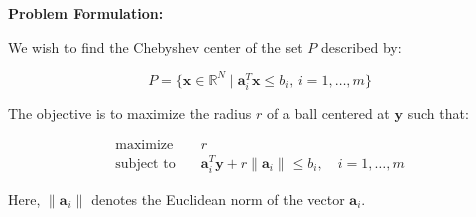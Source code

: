 \documentclass{article}
\begin{document}
\textbf{Problem Formulation:}

We wish to find the Chebyshev center of the set \( P \) described by:

\[
P = \{ \mathbf{x} \in \mathbb{R}^N \mid \mathbf{a}_i^T \mathbf{x} \leq b_i, \, i = 1, \ldots, m \}
\]

The objective is to maximize the radius \( r \) of a ball centered at \( \mathbf{y} \) such that:

\[
\begin{align*}
\text{maximize} \quad & r \\
\text{subject to} \quad & \mathbf{a}_i^T \mathbf{y} + r \|\mathbf{a}_i\| \leq b_i, \quad i = 1, \ldots, m
\end{align*}
\]

Here, \( \|\mathbf{a}_i\| \) denotes the Euclidean norm of the vector \( \mathbf{a}_i \).
\end{document}
